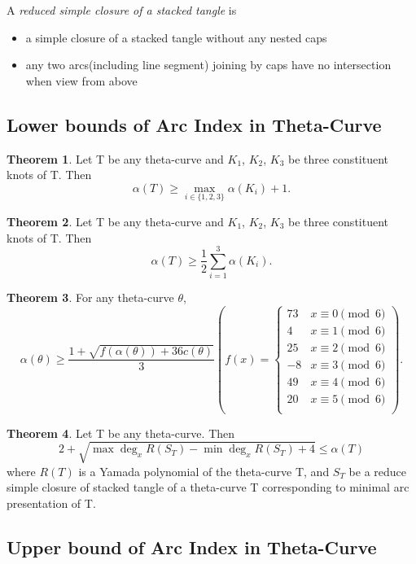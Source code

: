 \documentclass{article}
\theoremstyle{definition}
\theoremstyle{theorem}
\newtheorem{theorem}{Theorem}
\theoremstyle{proposition}
\theoremstyle{corollary}
\begin{document}
A \textit{reduced simple closure of a stacked tangle} is
\begin{itemize}
    \item a simple closure of a stacked tangle without any nested caps
    \item any two arcs(including line segment) joining by caps have no intersection when view from above
\end{itemize}

\subsection{Lower bounds of Arc Index in Theta-Curve}

\begin{theorem}
Let T be any theta-curve and $K_1$, $K_2$, $K_3$ be three constituent knots of T. Then $$\alpha(T) \geq \underset{i \in \{1,2,3\}}\max \alpha(K_i) + 1.$$
\end{theorem}

\begin{theorem}
Let T be any theta-curve and $K_1$, $K_2$, $K_3$ be three constituent knots of T. Then $$\alpha(T) \geq \frac{1}{2}\sum_{i=1}^3\alpha(K_i).$$
\end{theorem}

\begin{theorem}
For any theta-curve $\theta$, $$\alpha(\theta)\geq\frac{1+\sqrt{f(\alpha(\theta))+36c(\theta)}}{3} \left(f(x) = \begin{cases} 
		73 & x \equiv 0 \pmod 6\\ 
		4 & x \equiv 1 \pmod 6\\ 
		25 & x \equiv 2 \pmod 6\\ 
		-8 & x \equiv 3 \pmod 6\\ 
		49 & x \equiv 4 \pmod 6\\ 
		20 & x \equiv 5 \pmod 6\\ 
     \end{cases} \right).$$
\end{theorem}

\begin{theorem}
Let T be any theta-curve. Then $$2+\sqrt{\max\deg_x R(S_T) - \min\deg_x R(S_T) + 4} \leq \alpha(T)$$ where $R(T)$ is a Yamada polynomial of the theta-curve T, and $S_{T}$ be a reduce simple closure of stacked tangle of a theta-curve T corresponding to minimal arc presentation of T.
\end{theorem}

\subsection{Upper bound of Arc Index in Theta-Curve}
\end{document}
